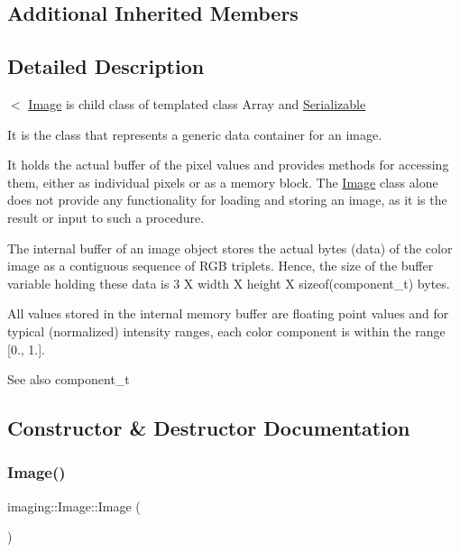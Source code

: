 \subsection*{Additional Inherited Members}


\subsection{Detailed Description}
$<$ \hyperlink{classimaging_1_1_image}{Image} is child class of templated class Array and \hyperlink{class_serializable}{Serializable} 

It is the class that represents a generic data container for an image.

It holds the actual buffer of the pixel values and provides methods for accessing them, either as individual pixels or as a memory block. The \hyperlink{classimaging_1_1_image}{Image} class alone does not provide any functionality for loading and storing an image, as it is the result or input to such a procedure.

The internal buffer of an image object stores the actual bytes (data) of the color image as a contiguous sequence of R\+GB triplets. Hence, the size of the buffer variable holding these data is 3 X width X height X sizeof(component\+\_\+t) bytes.

All values stored in the internal memory buffer are floating point values and for typical (normalized) intensity ranges, each color component is within the range \mbox{[}0., 1.\mbox{]}.

\begin{DoxySeeAlso}{See also}
component\+\_\+t 
\end{DoxySeeAlso}


\subsection{Constructor \& Destructor Documentation}
\mbox{\label{classimaging_1_1_image_abd5fddfa49e3430c610cef4ed34ce099}} 
\subsubsection{\texorpdfstring{Image()}{Image()}\hspace{0.1cm}{\footnotesize\ttfamily [1/4]}}
{\footnotesize\ttfamily imaging\+::\+Image\+::\+Image (\begin{DoxyParamCaption}{ }\end{DoxyParamCaption})}

